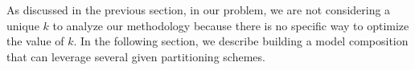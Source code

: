 As discussed in the previous section, in our problem, we are not considering a unique $k$ to analyze our methodology because there is no specific way to optimize the value of $k$. In the following section, we describe building a model composition that can leverage several given partitioning schemes.





